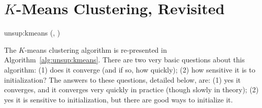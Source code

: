\section[K-Means Clustering, Revisited]{$K$-Means Clustering, Revisited}

\newalgorithm%
  {unsup:kmeans}%
  {(, )}
  {
 
\ENDFOR
\REPEAT
{}
\ENDFOR
{}
\ENDFOR
{}
\RETURN {} 
}


The $K$-means clustering algorithm is re-presented in
Algorithm~\ref{alg:unsup:kmeans}.  There are two very basic questions
about this algorithm: (1) does it converge (and if so, how quickly);
(2) how sensitive it is to initialization?  The answers to these
questions, detailed below, are: (1) yes it converges, and it converges
very quickly in practice (though slowly in theory); (2) yes it is
sensitive to initialization, but there are good ways to initialize it.

